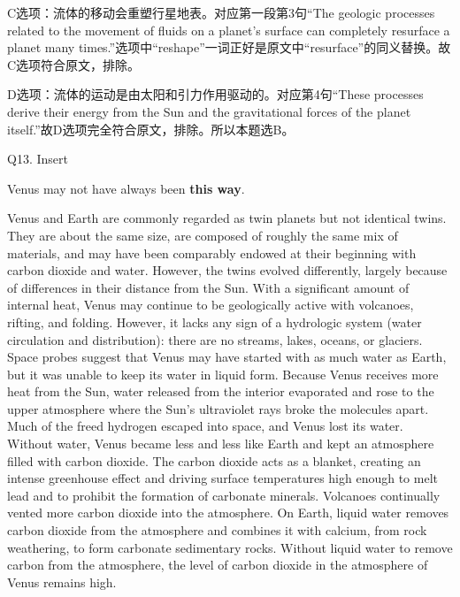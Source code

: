 \begin{blk}
\begin{nlz}
        C选项：流体的移动会重塑行星地表。对应第一段第3句“The geologic processes related to the movement of fluids on a planet's surface can completely resurface a planet many times.”选项中“reshape”一词正好是原文中“resurface”的同义替换。故C选项符合原文，排除。

        D选项：流体的运动是由太阳和引力作用驱动的。对应第4句“These processes derive their energy from the Sun and the gravitational forces of the planet itself.”故D选项完全符合原文，排除。所以本题选B。
    \end{nlz}
\end{blk}

\begin{blk}
    \begin{qst}
        Q13. Insert
    \end{qst}

    \begin{chc}
        Venus may not have always been \textbf{this way}.
    \end{chc}

    \begin{psgq}
        Venus and Earth are commonly regarded as twin planets but not identical twins. They are about the same size, are composed of roughly the same mix of materials, and may have been comparably endowed at their beginning with carbon dioxide and water. However, the twins evolved differently, largely because of differences in their distance from the Sun. With a significant amount of internal heat, Venus may continue to be geologically active with volcanoes, rifting, and folding. However, it lacks any sign of a hydrologic system (water circulation and distribution): there are no streams, lakes, oceans, or glaciers. Space probes suggest that Venus may have started with as much water as Earth, but it was unable to keep its water in liquid form. Because Venus receives more heat from the Sun, water released from the interior evaporated and rose to the upper atmosphere where the Sun’s ultraviolet rays broke the molecules apart. Much of the freed hydrogen escaped into space, and Venus lost its water. Without water, Venus became less and less like Earth and kept an atmosphere filled with carbon dioxide. The carbon dioxide acts as a blanket, creating an intense greenhouse effect and driving surface temperatures high enough to melt lead and to prohibit the formation of carbonate minerals. Volcanoes continually vented more carbon dioxide into the atmosphere. On Earth, liquid water removes carbon dioxide from the atmosphere and combines it with calcium, from rock weathering, to form carbonate sedimentary rocks. Without liquid water to remove carbon from the atmosphere, the level of carbon dioxide in the atmosphere of Venus remains high.
    \end{psgq}


\end{blk}
